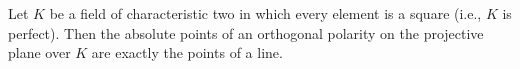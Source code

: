 Let $K$ be a field of characteristic two in which every element is a square (i.e., $K$ is perfect). Then the absolute points of an orthogonal polarity on the projective plane over $K$ are exactly the points of a line.
